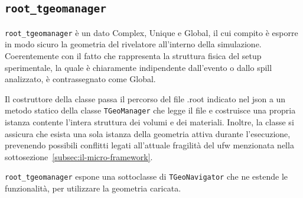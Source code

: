 \documentclass[../../main.tex]{subfiles}
\begin{document}
\subsection*{\texttt{root\_tgeomanager}}
  \texttt{root\_tgeomanager} è un dato Complex, Unique e Global,
  il cui compito è esporre in modo sicuro la geometria del
  rivelatore all'interno della simulazione.
  Coerentemente con il fatto che rappresenta la struttura fisica del setup
  sperimentale, la quale è chiaramente indipendente dall'evento o dallo spill
  analizzato, è contrassegnato come Global.

  Il costruttore della classe passa il percorso del file .root indicato nel
  json a un metodo statico della classe \texttt{TGeoManager} che legge
  il file e costruisce una propria istanza contente l'intera struttura
  dei volumi e dei materiali.
  Inoltre, la classe si assicura che esista una sola istanza della geometria
  attiva durante l'esecuzione, prevenendo possibili conflitti legati
  all'attuale fragilità del ufw menzionata nella
  sottosezione~\ref{subsec:il-micro-framework}.

  \texttt{root\_tgeomanager} espone una sottoclasse di \texttt{TGeoNavigator}
  che ne estende le funzionalità, per utilizzare la geometria caricata.
\end{document}
